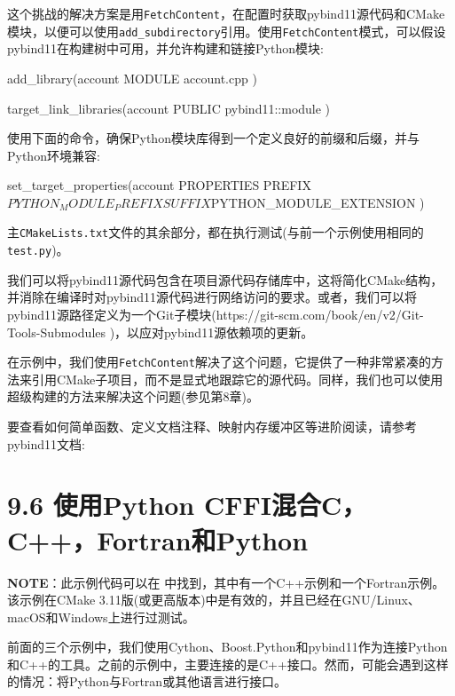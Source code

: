 这个挑战的解决方案是用\texttt{FetchContent}，在配置时获取pybind11源代码和CMake模块，以便可以使用\texttt{add\_subdirectory}引用。使用\texttt{FetchContent}模式，可以假设pybind11在构建树中可用，并允许构建和链接Python模块:

\begin{codebox}[cmake]
add_library(account
  MODULE
    account.cpp
  )

target_link_libraries(account
  PUBLIC
    pybind11::module
  )
\end{codebox}

使用下面的命令，确保Python模块库得到一个定义良好的前缀和后缀，并与Python环境兼容:

\begin{codebox}[cmake]
set_target_properties(account
  PROPERTIES
    PREFIX ${PYTHON_MODULE_PREFIX}
    SUFFIX ${PYTHON_MODULE_EXTENSION}
  )
\end{codebox}

主\texttt{CMakeLists.txt}文件的其余部分，都在执行测试(与前一个示例使用相同的\texttt{test.py})。


我们可以将pybind11源代码包含在项目源代码存储库中，这将简化CMake结构，并消除在编译时对pybind11源代码进行网络访问的要求。或者，我们可以将pybind11源路径定义为一个Git子模块(https://git-scm.com/book/en/v2/Git-Tools-Submodules )，以应对pybind11源依赖项的更新。

在示例中，我们使用\texttt{FetchContent}解决了这个问题，它提供了一种非常紧凑的方法来引用CMake子项目，而不是显式地跟踪它的源代码。同样，我们也可以使用超级构建的方法来解决这个问题(参见第8章)。

要查看如何简单函数、定义文档注释、映射内存缓冲区等进阶阅读，请参考pybind11文档:


\section{9.6 使用Python CFFI混合C，C++，Fortran和Python}

\begin{myInfoBox}
\textbf{NOTE}：此示例代码可以在  中找到，其中有一个C++示例和一个Fortran示例。该示例在CMake 3.11版(或更高版本)中是有效的，并且已经在GNU/Linux、macOS和Windows上进行过测试。
\end{myInfoBox}

前面的三个示例中，我们使用Cython、Boost.Python和pybind11作为连接Python和C++的工具。之前的示例中，主要连接的是C++接口。然而，可能会遇到这样的情况：将Python与Fortran或其他语言进行接口。

